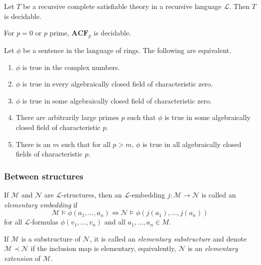 \documentclass[
	fontsize=10pt, %
]{kaohandt}
\begin{document}
\begin{lemma}
    Let $T$ be a recursive complete satisfiable theory in a recursive language $\mathcal{L}$. 
    Then $T$ is decidable.
\end{lemma}

\begin{corollary}
    For $p = 0$ or $p$ prime, $\mathbf{ACF}_p$ is decidable.
\end{corollary}

\begin{corollary}
    Let $\phi$ be a sentence in the language of rings.
    The following are equivalent.
    \begin{enumerate}[label = {\roman*)}]
        \item $\phi$ is true in the complex numbers.
        \item $\phi$ is true in every algebraically closed field of characteristic zero.
        \item $\phi$ is true in some algebraically closed field of characteristic zero.
        \item There are arbitrarily large primes $p$ such that $\phi$ is true in some algebraically closed field of characteristic $p$.
        \item There is an $m$ such that for all $p > m$, $\phi$ is true in all algebraically closed fields of characteristic $p$.
    \end{enumerate}
\end{corollary}

\subsubsection{Between structures}
\begin{definition}
    If $\mathcal{M}$ and $\mathcal{N}$ are $\mathcal{L}$-structures,
    then an $\mathcal{L}$-embedding $j: \mathcal{M} \to \mathcal{N}$ is called an \emph{elementary embedding} if 
    \[
    \mathcal{M} \models \phi(a_1,\dots,a_n) \iff \mathcal{N} \models \phi(j(a_1),\dots,j(a_n))
    \] 
    for all $\mathcal{L}$-formulas $\phi(v_1,\dots,v_n)$ and all $a_1,\dots,a_n \in M$.

    If $\mathcal{M}$ is a substructure of $\mathcal{N}$, 
    it is called an \emph{elementary substructure} and 
    denote $\mathcal{M} \prec \mathcal{N}$ if the inclusion map is elementary,
    equivalently, $\mathcal{N}$ is an \emph{elementary extension} of $\mathcal{M}$.
\end{definition}
\end{document}
